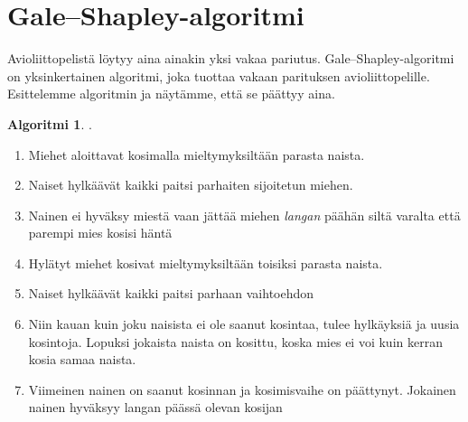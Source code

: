 \documentclass[finnish]{tktltiki2}
\theoremstyle{definition}
\newtheorem{alg}[lau]{Algoritmi}
\theoremstyle{remark}
\begin{document}
\section{Gale--Shapley-algoritmi}
Avioliittopelistä löytyy aina ainakin yksi vakaa pariutus. Gale--Shapley-algoritmi on yksinkertainen algoritmi, joka tuottaa vakaan parituksen avioliittopelille. Esittelemme algoritmin ja näytämme, että se päättyy aina.
\begin{alg} \cite[p. 13]{gale62a} \label{gsalg}.
\begin{enumerate}
	\item Miehet aloittavat kosimalla mieltymyksiltään parasta naista.
	\item Naiset hylkäävät kaikki paitsi parhaiten sijoitetun miehen.
	\item Nainen ei hyväksy miestä vaan jättää miehen \emph{langan} päähän siltä varalta että parempi mies kosisi häntä
	\item Hylätyt miehet kosivat mieltymyksiltään toisiksi parasta naista.
	\item Naiset hylkäävät kaikki paitsi parhaan vaihtoehdon
	\item Niin kauan kuin joku naisista ei ole saanut kosintaa, tulee hylkäyksiä ja uusia kosintoja. Lopuksi jokaista naista on kosittu, koska mies ei voi kuin kerran kosia samaa naista.
	\item Viimeinen nainen on saanut kosinnan ja kosimisvaihe on päättynyt. Jokainen nainen hyväksyy langan päässä olevan kosijan
\end{enumerate}
\end{alg}
\end{document}
